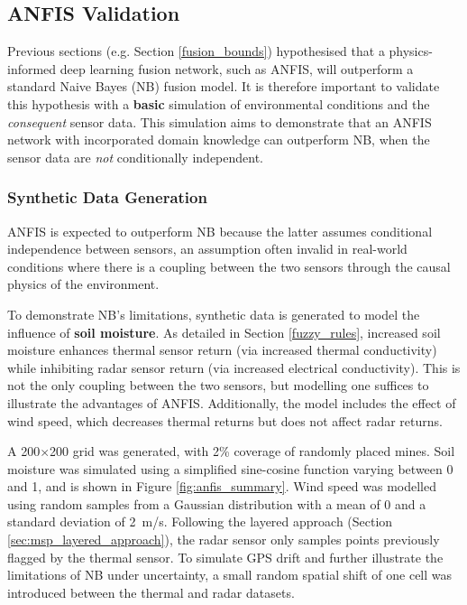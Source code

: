 \subsection{ANFIS Validation} \label{compvis_anfisvalid}

Previous sections (e.g. Section \ref{fusion_bounds}) hypothesised that a physics-informed deep learning fusion network, such as ANFIS, will outperform a standard Naive Bayes (NB) fusion model. It is therefore important to validate this hypothesis with a \textbf{basic} simulation of environmental conditions and the \textit{consequent} sensor data. This simulation aims to demonstrate that an ANFIS network with incorporated domain knowledge can outperform NB, when the sensor data are \textit{not} conditionally independent.

\subsubsection{Synthetic Data Generation}  

    ANFIS is expected to outperform NB because the latter assumes conditional independence between sensors, an assumption often invalid in real-world conditions where there is a coupling between the two sensors through the causal physics of the environment. 
    
    To demonstrate NB's limitations, synthetic data is generated to model the influence of \textbf{soil moisture}. As detailed in Section \ref{fuzzy_rules}, increased soil moisture enhances thermal sensor return (via increased thermal conductivity) while inhibiting radar sensor return (via increased electrical conductivity). This is not the only coupling between the two sensors, but modelling one suffices to illustrate the advantages of ANFIS. Additionally, the model includes the effect of wind speed, which decreases thermal returns but does not affect radar returns.


    A 200$\times$200 grid was generated, with 2\% coverage of randomly placed mines. Soil moisture was simulated using a simplified sine-cosine function varying between 0 and 1, and is shown in Figure \ref{fig:anfis_summary}. Wind speed was modelled using random samples from a Gaussian distribution with a mean of 0 and a standard deviation of 2~m/s. Following the layered approach (Section \ref{sec:msp_layered_approach}), the radar sensor only samples points previously flagged by the thermal sensor. To simulate GPS drift and further illustrate the limitations of NB under uncertainty, a small random spatial shift of one cell was introduced between the thermal and radar datasets.


